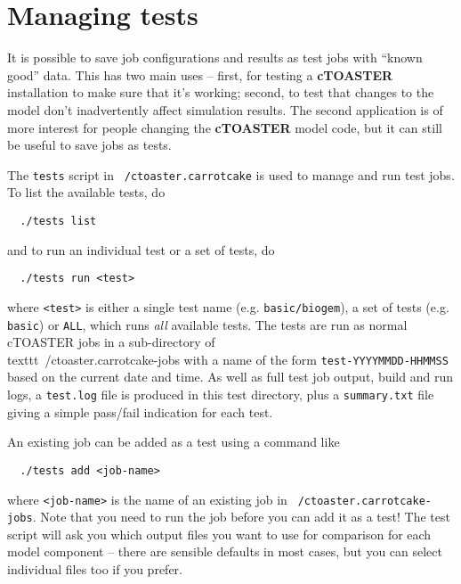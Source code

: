 \documentclass[a4paper,10pt,article]{memoir}
\begin{document}
\section{Managing tests}

It is possible to save job configurations and results as test jobs
with ``known good'' data.  This has two main uses -- first, for
testing a \textbf{cTOASTER} installation to make sure that it's working; second,
to test that changes to the model don't inadvertently affect
simulation results.  The second application is of more interest for
people changing the \textbf{cTOASTER} model code, but it can still be useful to
save jobs as tests.

The \texttt{tests} script in \texttt{~/ctoaster.carrotcake} is used to manage and
run test jobs.  To list the available tests, do
\begin{verbatim}
  ./tests list
\end{verbatim}
and to run an individual test or a set of tests, do
\begin{verbatim}
  ./tests run <test>
\end{verbatim}
where \texttt{<test>} is either a single test name (e.g.
\texttt{basic/biogem}), a set of tests (e.g. \texttt{basic}) or
\texttt{ALL}, which runs \emph{all} available tests.  The tests are
run as normal cTOASTER jobs in a sub-directory of \
\\texttt{~/ctoaster.carrotcake-jobs}
with a name of the form \texttt{test-YYYYMMDD-HHMMSS} based on the
current date and time.  As well as full test job output, build and run
logs, a \texttt{test.log} file is produced in this test directory,
plus a \texttt{summary.txt} file giving a simple pass/fail indication
for each test.

An existing job can be added as a test using a command like
\begin{verbatim}
  ./tests add <job-name>
\end{verbatim}
where \texttt{<job-name>} is the name of an existing job in
\texttt{~/ctoaster.carrotcake-jobs}.  Note that you need to run the job before you
can add it as a test!  The test script will ask you which output files
you want to use for comparison for each model component -- there are
sensible defaults in most cases, but you can select individual files
too if you prefer.
\end{document}
